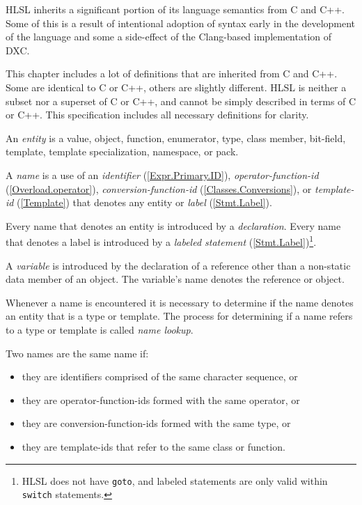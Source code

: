 
\begin{note}
  HLSL inherits a significant portion of its language semantics from C and C++.
  Some of this is a result of intentional adoption of syntax early in the development
  of the language and some a side-effect of the Clang-based implementation of DXC.

  This chapter includes a lot of definitions that are inherited from C and C++.
  Some are identical to C or C++, others are slightly different. HLSL is neither
  a subset nor a superset of C or C++, and cannot be simply described in terms
  of C or C++. This specification includes all necessary definitions for clarity.
\end{note}


\p An \textit{entity} is a value, object, function, enumerator, type, class
member, bit-field, template, template specialization, namespace, or pack.

\p A \textit{name} is a use of an \textit{identifier} (\ref{Expr.Primary.ID}),
\textit{operator-function-id} (\ref{Overload.operator}),
\textit{conversion-function-id} (\ref{Classes.Conversions}),
or \textit{template-id} (\ref{Template}) that denotes any entity or
\textit{label} (\ref{Stmt.Label}).

\p Every name that denotes an entity is introduced by a \textit{declaration}.
Every name that denotes a label is introduced by a \textit{labeled statement}
(\ref{Stmt.Label})\footnote{HLSL does not have \texttt{goto}, and labeled
statements are only valid within \texttt{switch} statements.}.

\p A \textit{variable} is introduced by the declaration of a reference other
than a non-static data member of an object. The variable's name denotes the
reference or object.

\p Whenever a name is encountered it is necessary to determine if the name
denotes an entity that is a type or template. The process for determining if a
name refers to a type or template is called \textit{name lookup}.

\p Two names are the same name if:
\begin{itemize}
\item they are identifiers comprised of the same character sequence, or
\item they are operator-function-ids formed with the same operator, or
\item they are conversion-function-ids formed with the same type, or
\item they are template-ids that refer to the same class or function.
\end{itemize}

